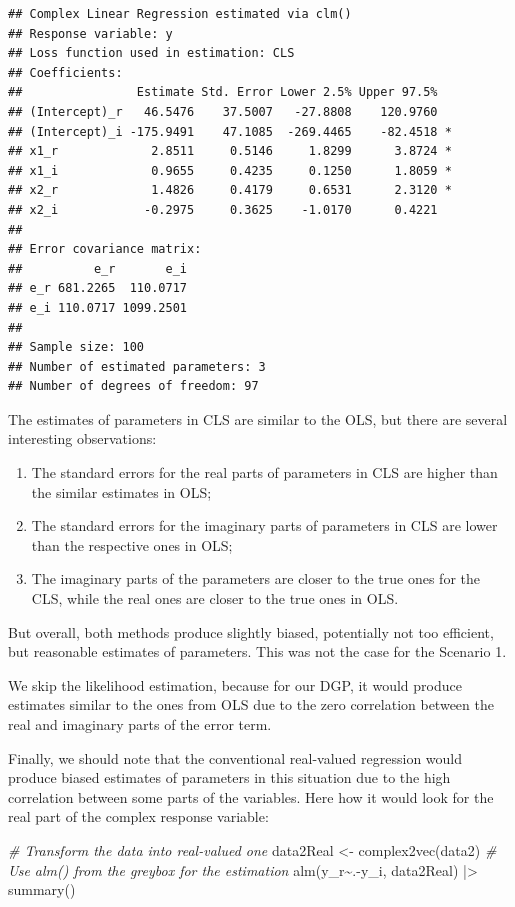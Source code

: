\documentclass[
]{book}
\newenvironment{Shaded}{\begin{snugshade}}{\end{snugshade}}
\newcommand{\CommentTok}[1]{\textcolor[rgb]{0.56,0.35,0.01}{\textit{#1}}}
\newcommand{\FunctionTok}[1]{\textcolor[rgb]{0.00,0.00,0.00}{#1}}
\newcommand{\NormalTok}[1]{#1}
\newcommand{\OtherTok}[1]{\textcolor[rgb]{0.56,0.35,0.01}{#1}}
\newcommand{\SpecialCharTok}[1]{\textcolor[rgb]{0.00,0.00,0.00}{#1}}
\providecommand{\tightlist}{%
  \setlength{\itemsep}{0pt}\setlength{\parskip}{0pt}}
\begin{document}
\begin{verbatim}
## Complex Linear Regression estimated via clm()
## Response variable: y
## Loss function used in estimation: CLS
## Coefficients:
##                Estimate Std. Error Lower 2.5% Upper 97.5%  
## (Intercept)_r   46.5476    37.5007   -27.8808    120.9760  
## (Intercept)_i -175.9491    47.1085  -269.4465    -82.4518 *
## x1_r             2.8511     0.5146     1.8299      3.8724 *
## x1_i             0.9655     0.4235     0.1250      1.8059 *
## x2_r             1.4826     0.4179     0.6531      2.3120 *
## x2_i            -0.2975     0.3625    -1.0170      0.4221  
## 
## Error covariance matrix:
##          e_r       e_i
## e_r 681.2265  110.0717
## e_i 110.0717 1099.2501
## 
## Sample size: 100
## Number of estimated parameters: 3
## Number of degrees of freedom: 97
\end{verbatim}

The estimates of parameters in CLS are similar to the OLS, but there are several interesting observations:

\begin{enumerate}
\def\labelenumi{\arabic{enumi}.}
\tightlist
\item
  The standard errors for the real parts of parameters in CLS are higher than the similar estimates in OLS;
\item
  The standard errors for the imaginary parts of parameters in CLS are lower than the respective ones in OLS;
\item
  The imaginary parts of the parameters are closer to the true ones for the CLS, while the real ones are closer to the true ones in OLS.
\end{enumerate}

But overall, both methods produce slightly biased, potentially not too efficient, but reasonable estimates of parameters. This was not the case for the Scenario 1.

We skip the likelihood estimation, because for our DGP, it would produce estimates similar to the ones from OLS due to the zero correlation between the real and imaginary parts of the error term.

Finally, we should note that the conventional real-valued regression would produce biased estimates of parameters in this situation due to the high correlation between some parts of the variables. Here how it would look for the real part of the complex response variable:

\begin{Shaded}
\begin{Highlighting}[]
\CommentTok{\# Transform the data into real{-}valued one}
\NormalTok{data2Real }\OtherTok{\textless{}{-}} \FunctionTok{complex2vec}\NormalTok{(data2)}
\CommentTok{\# Use alm() from the greybox for the estimation}
\FunctionTok{alm}\NormalTok{(y\_r}\SpecialCharTok{\textasciitilde{}}\NormalTok{.}\SpecialCharTok{{-}}\NormalTok{y\_i, data2Real) }\SpecialCharTok{|\textgreater{}}
    \FunctionTok{summary}\NormalTok{()}
\end{Highlighting}
\end{Shaded}
\end{document}
